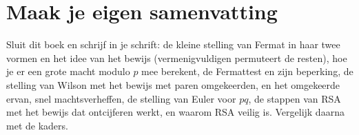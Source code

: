 
\ifzelfstudie
\section*{Maak je eigen samenvatting}
Sluit dit boek en schrijf in je schrift: de kleine stelling van Fermat in haar twee vormen en het idee van het bewijs (vermenigvuldigen permuteert de resten), hoe je er een grote macht modulo $p$ mee berekent, de Fermattest en zijn beperking, de stelling van Wilson met het bewijs met paren omgekeerden, en het omgekeerde ervan, snel machtsverheffen, de stelling van Euler voor $pq$, de stappen van RSA met het bewijs dat ontcijferen werkt, en waarom RSA veilig is. Vergelijk daarna met de kaders.
\fi
